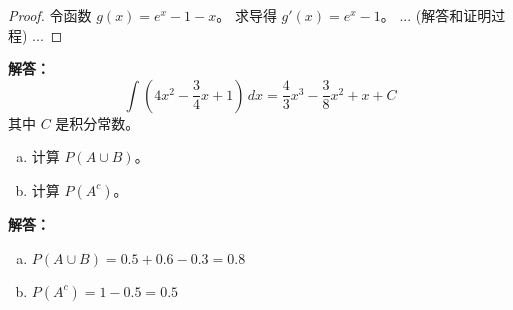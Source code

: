 \documentclass{homework}
\begin{document}
    \begin{proof}
    令函数 $g(x) = e^x - 1 - x$。
    求导得 $g'(x) = e^x - 1$。
    ... (解答和证明过程) ...
    \end{proof}


    \textbf{解答：}
    $$
    \int \left(4x^2 - \frac{3}{4}x + 1\right) \, dx = \frac{4}{3}x^3 - \frac{3}{8}x^2 + x + C
    $$
    其中 $C$ 是积分常数。

    \begin{enumerate}[(a)] %
        \item 计算 $P(A \cup B)$。
        \item 计算 $P(A^c)$。
    \end{enumerate}

    \textbf{解答：}
    \begin{enumerate}[(a)]
        \item $P(A \cup B) = 0.5 + 0.6 - 0.3 = \mathbf{0.8}$
        \item $P(A^c) = 1 - 0.5 = \mathbf{0.5}$
    \end{enumerate}
\end{document}
